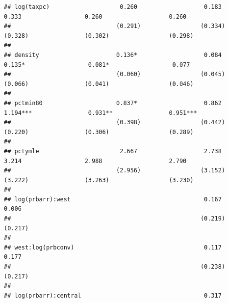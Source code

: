 \documentclass[]{article}
\begin{document}
\begin{verbatim}
## log(taxpc)                    0.260                   0.183                   0.333                  0.260                   0.260         
##                              (0.291)                 (0.334)                 (0.328)                (0.302)                 (0.298)        
##                                                                                                                                            
## density                      0.136*                   0.084                  0.135*                  0.081*                  0.077         
##                              (0.060)                 (0.045)                 (0.066)                (0.041)                 (0.046)        
##                                                                                                                                            
## pctmin80                     0.837*                   0.862                 1.194***                0.931**                0.951***        
##                              (0.398)                 (0.442)                 (0.220)                (0.306)                 (0.289)        
##                                                                                                                                            
## pctymle                       2.667                   2.738                   3.214                  2.988                   2.790         
##                              (2.956)                 (3.152)                 (3.222)                (3.263)                 (3.230)        
##                                                                                                                                            
## log(prbarr):west                                      0.167                                                                  0.006         
##                                                      (0.219)                                                                (0.217)        
##                                                                                                                                            
## west:log(prbconv)                                     0.117                                                                  0.177         
##                                                      (0.238)                                                                (0.217)        
##                                                                                                                                            
## log(prbarr):central                                   0.317                                                                                

\end{verbatim}
\end{document}
